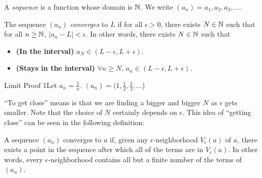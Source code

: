 \begin{definition}
    A \textit{sequence} is a function whose domain is \(\mathbb{N}\). We write \((a_n) = a_1,a_2,a_3,\dots\).
\end{definition}
\setcounter{BoxCounter}{2}
\begin{definition}
    The sequence \((a_n)\) \textit{converges} to \(L\) if for all \(\epsilon > 0\), there exists \(N \in \mathbb{N}\) such that for all \(n \geq \mathbb{N}\), \(|a_n - L| < \epsilon\). In other words, there exists \(N \in \mathbb{N}\) such that
    \begin{itemize}
        \item \textbf{(In the interval)} \(a_N \in (L - \epsilon, L + \epsilon)\).
        \item \textbf{(Stays in the interval)} \(\forall n \geq N\), \(a_n \in (L - \epsilon, L + \epsilon)\).
    \end{itemize}
\end{definition}

\begin{example}
    {Limit Proof 1}Let \(a_n = \frac{1}{n}\). \((a_n) = (1,\frac{1}{2},\frac{1}{3},\dots\))
\end{example}


``To get close'' means is that we are finding a bigger and bigger \(N\) as \(\epsilon\) gets smaller. Note that the choice of \(N\) certainly depends on \(\epsilon\). This idea of ``getting close'' can be seen in the following definition:

\begin{tcolorbox}%
    [rounded corners, colframe=xred, colback=xred!15, coltitle=white, label=def:2.2.3B, title={\large \textbf{Definition 2.2.3B}}]
    A sequence \( (a_n) \) converges to \( a \) if, given any \( \epsilon \)-neighborhood \( V_\epsilon(a) \) of \( a \), there exists a point in the sequence after which all of the terms are in \( V_\epsilon(a) \). In other words, every \( \epsilon \)-neighborhood contains all but a finite number of the terms of \( (a_n) \).
\end{tcolorbox}

